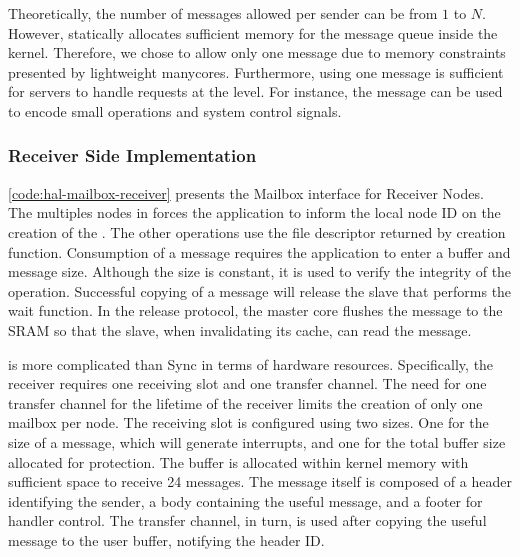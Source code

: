 			Theoretically, the number of messages allowed per sender can be from
			$1$ to $N$. However, \nanvix \hal statically allocates sufficient
			memory for the message queue inside the kernel. Therefore, we chose
			to allow only one message due to memory constraints presented by
			lightweight manycores. Furthermore, using one message is sufficient	for
			servers to handle requests at the \multikernel level. For instance, the
			message can be used to encode small operations and system control signals.
			
			\subsubsection{Receiver Side Implementation}

					\autoref{code:hal-mailbox-receiver} presents the Mailbox interface for
					Receiver Nodes. The multiples nodes in \ioclusters forces the application
					to inform the local node ID on the creation of the \mailbox. The other
					operations use the file descriptor returned by creation function.
					Consumption of a message requires the application to enter a buffer and
					message size. Although the size is constant, it is used to verify the
					integrity of the operation. Successful copying of a message will release
					the slave that performs the wait function. In the release protocol, the
					master core flushes the message to the SRAM so that the slave, when
					invalidating its cache, can read the message.
					
					\mailbox is more complicated than Sync in terms of hardware resources.
					Specifically, the receiver requires one \dnoc receiving slot and one \cnoc
					transfer channel. The need for one transfer channel for the lifetime
					of the receiver limits the creation of only one mailbox per \noc node.
					The receiving slot is configured using two sizes. One for the size of
					a message, which will generate interrupts, and one for the total buffer
					size allocated for protection. The buffer is allocated within kernel
					memory with sufficient space to receive 24 messages. The message
					itself is composed of a header identifying the sender, a body containing
					the useful message, and a footer for handler control. The transfer channel,
					in turn, is used after copying the useful message to the user buffer,
					notifying the header ID.
					
